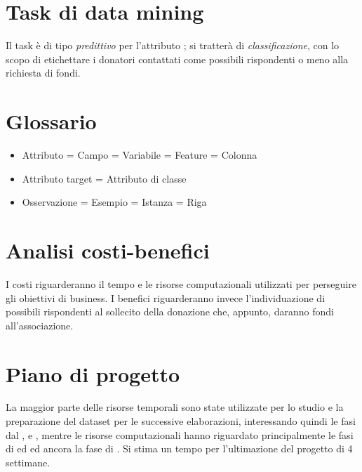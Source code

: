 \section{Task di data mining}
Il task è di tipo \emph{predittivo} per l'attributo \tb{}; si tratterà di \emph{classificazione}, con lo scopo di etichettare i donatori contattati come possibili rispondenti o meno alla richiesta di fondi.

\section{Glossario}
\begin{itemize}
	\item Attributo = Campo = Variabile = Feature = Colonna
	\item Attributo target = Attributo di classe
	\item Osservazione = Esempio = Istanza = Riga
\end{itemize}

\section{Analisi costi-benefici}
I costi riguarderanno il tempo e le risorse computazionali utilizzati per perseguire gli obiettivi di business. I benefici riguarderanno invece l'individuazione di possibili rispondenti al sollecito della donazione che, appunto, daranno fondi all'associazione.

\section{Piano di progetto}
La maggior parte delle risorse temporali sono state utilizzate per lo studio e la preparazione del dataset per le successive elaborazioni, interessando quindi le fasi dal ,  e , mentre le risorse computazionali hanno riguardato principalmente le fasi di  ed  ed ancora la fase di . Si stima un tempo per l'ultimazione del progetto di 4 settimane.


